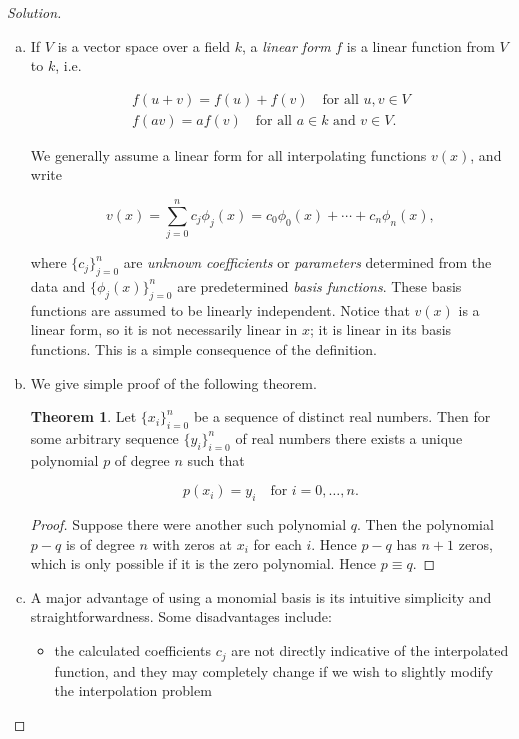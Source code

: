 \documentclass[12pt,a4]{article}
\theoremstyle{definition}
\newtheorem*{theorem*}{Theorem}
\begin{document}
\begin{proof}[Solution]
\begin{enumerate}[(a)]
		\item If $V$ is a vector space over a field $k$, a \emph{linear form} $f$ is a linear function from $V$ to $k$, i.e.
		
		\begin{gather*}
		f(u + v) = f(u) + f(v) \quad \text{for all } u, v \in V \\
		f(a v) = a f(v) \quad \text{for all } a \in k \text{ and } v \in V {.}
		\end{gather*}
		
		We generally assume a linear form for all interpolating functions $v(x)$, and write 
		
		\[
		v(x) = \sum_{j = 0}^n c_j \phi_j(x) = c_0 \phi_0(x) + \cdots + c_n \phi_n(x) {,}
		\]
		
		where $\{ c_j \}_{j = 0}^n$ are \emph{unknown coefficients} or \emph{parameters} determined from the data and $\{ \phi_j (x) \}_{j  = 0}^n$ are predetermined \emph{basis functions}. These basis functions are assumed to be linearly independent. Notice that $v(x)$ is a linear form, so it is not necessarily linear in $x$; it is linear in its basis functions. This is a simple consequence of the definition. 
		
		\item We give simple proof of the following theorem. 
		
		\begin{theorem*}
			Let $\{ x_i \}_{i = 0}^n$ be a sequence of distinct real numbers. Then for some arbitrary sequence $\{ y_i \}_{i = 0}^n$ of real numbers there exists a unique polynomial $p$ of degree $n$ such that 
			
			\[
			p(x_i) = y_i \quad \text{for } i = 0, \ldots, n {.}
			\]
		\end{theorem*}
		\begin{proof}
			Suppose there were another such polynomial $q$. Then the polynomial $p - q$ is of degree $n$ with zeros at $x_i$ for each $i$. Hence $p - q$ has $n + 1$ zeros, which is only possible if it is the zero polynomial. Hence $p \equiv q$. 
		\end{proof}
		
		\item A major advantage of using a monomial basis is its intuitive simplicity and straightforwardness. Some disadvantages include: 
		
		\begin{itemize}
			\item the calculated coefficients $c_j$ are not directly indicative of the interpolated function, and they may completely change if we wish to slightly modify the interpolation problem
			

\end{itemize}
\end{enumerate}
\end{proof}
\end{document}
